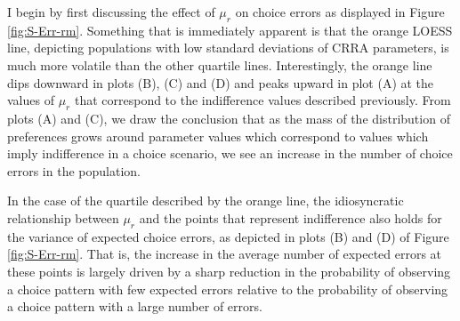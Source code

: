 \documentclass[../main.tex]{subfiles}
\begin{document}
I begin by first discussing the effect of $\mu_r$ on choice errors as displayed in Figure \ref{fig:S-Err-rm}.
Something that is immediately apparent is that the orange LOESS line, depicting populations with low standard deviations of CRRA parameters, is much more volatile than the other quartile lines.
Interestingly, the orange line dips downward in plots (B), (C) and (D) and peaks upward in plot (A) at the values of $\mu_r$ that correspond to the indifference values described previously.
From plots (A) and (C), we draw the conclusion that as the mass of the distribution of preferences grows around parameter values which correspond to values which imply indifference in a choice scenario, we see an increase in the number of choice errors in the population.

In the case of the quartile described by the orange line, the idiosyncratic relationship between $\mu_r$ and the points that represent indifference also holds for the variance of expected choice errors, as depicted in plots (B) and (D) of Figure \ref{fig:S-Err-rm}.
That is, the increase in the average number of expected errors at these points is largely driven by a sharp reduction in the probability of observing a choice pattern with few expected errors relative to the probability of observing a choice pattern with a large number of errors.{\footnotemark}

\addtocounter{footnote}{-1}
\end{document}

